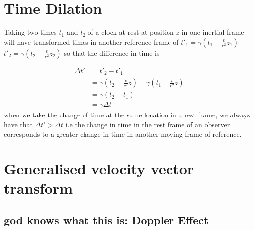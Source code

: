 \section{Time Dilation}

Taking two times $t_1$ and $t_2$ of a clock at rest at position $z$ in one inertial frame will have transformed times in another reference frame of $t'_1 = \gamma(t_1 - \frac{v}{c^2}z_1)$ $t'_2 = \gamma(t_2 - \frac{v}{c^2}z_2)$ so that the difference in time is

\begin{equation}%
\begin{aligned}
   \Delta t' &=  t'_2 - t'_1 \\ &= \gamma(t_2 - \frac{v}{c^2}z) - \gamma(t_1 - \frac{v}{c^2}z) \\ &= \gamma (t_2 - t_1 ) \\ &= \gamma \Delta t
\end{aligned}
\end{equation}%
when we take the change of time at the same location in a rest frame, we always have that $\Delta t' > \Delta t$ i.e the change in time in the rest frame of an observer corresponds to a greater change in time in another moving frame of reference.

\section{Generalised velocity vector transform}
\subsection{god knows what this is: Doppler Effect}

